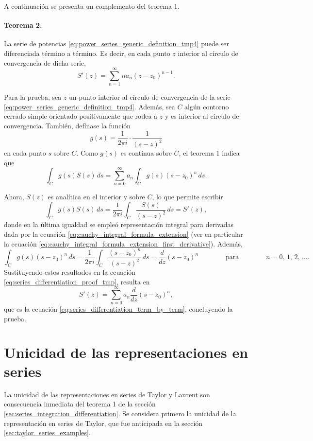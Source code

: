 \documentclass[a4paper]{report}
\begin{document}
A continuación se presenta un complemento del teorema 1.

\paragraph{Teorema 2.} La serie de potencias \ref{eq:power_series_generic_definition_tmp4} puede ser diferenciada término a término. Es decir, en cada punto \(z\) interior al círculo de convergencia de dicha serie,
\begin{equation}\label{eq:series_differentiation_term_by_term}
 S'(z)=\sum_{n=1}^\infty na_n(z-z_0)^{n-1}. 
\end{equation}

Para la prueba, sea \(z\) un punto interior al círculo de convergencia de la serie \ref{eq:power_series_generic_definition_tmp4}. Además, sea \(C\) algún contorno cerrado simple orientado positivamente que rodea a \(z\) y es interior al círculo de convergencia. También, defínase la función 
\[
 g(s)=\frac{1}{2\pi i}\cdot\frac{1}{(s-z)^2}
\]
en cada punto \(s\) sobre \(C\). Como \(g(s)\) es continua sobre \(C\), el teorema 1 indica que 
\begin{equation}\label{eq:series_differentiation_proof_tmp}
 \int_C g(s)S(s)\,ds=\sum_{n=0}^\infty a_n\int_C g(s)(s-z_0)^n\,ds. 
\end{equation}

Ahora, \(S(z)\) es analítica en el interior y sobre \(C\), lo que permite escribir
\[
 \int_C g(s)S(s)\,ds=\frac{1}{2\pi i}\int_C\frac{S(s)}{(s-z)^2}\,ds=S'(z),
\]
donde en la última igualdad se empleó representación integral para derivadas dada por la ecuación \ref{eq:cauchy_integral_formula_extension} (ver en particular la ecuación \ref{eq:cauchy_integral_formula_extension_first_derivative}). Además, 
\[
 \int_C g(s)(s-z_0)^n\,ds=\frac{1}{2\pi i}\int_C \frac{(s-z_0)^n}{(s-z)^2}\,ds=\frac{d}{dz}(s-z_0)^n
 \qquad\qquad\textrm{para}\qquad\qquad
 n=0,\,1,\,2,\,\dots.
\]
Sustituyendo estos resultados en la ecuación \ref{eq:series_differentiation_proof_tmp}, resulta en 
\[
 S'(z)=\sum_{n=0}^\infty a_n\frac{d}{dz}(s-z_0)^n,
\]
que es la ecuación \ref{eq:series_differentiation_term_by_term}, concluyendo la prueba.

\section{Unicidad de las representaciones en series}\label{sec:series_representation_unicity}

La unicidad de las representaciones en series de Taylor y Laurent son consecuencia inmediata del teorema 1 de la sección \ref{sec:series_integration_differentiation}. Se considera primero la unicidad de la representación en series de Taylor, que fue anticipada en la sección \ref{sec:taylor_series_examples}.
\end{document}
